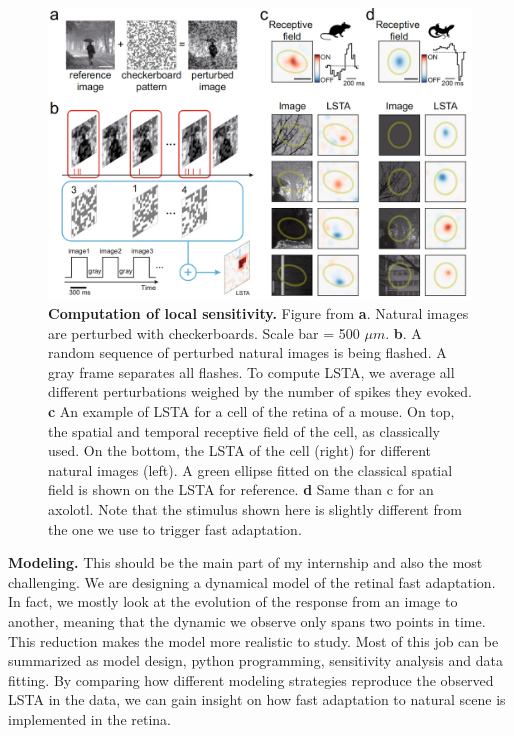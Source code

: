 \begin{figure}
    \centering
    \includegraphics[width=\textwidth]{images/LSTAExplain.png}
    \caption{\textbf{Computation of local sensitivity.} Figure from \citep{goldin_context-dependent_2022} \textbf{a}. Natural images are perturbed with checkerboards. Scale bar = 500 $\mu m$. \textbf{b}. A random sequence of perturbed natural images is being flashed. A gray frame separates all flashes. To compute LSTA, we average all different perturbations weighed by the number of spikes they evoked. \textbf{c} An example of LSTA for a cell of the retina of a mouse. On top, the spatial and temporal receptive field of the cell, as classically used. On the bottom, the LSTA of the cell (right) for different natural images (left).  A green ellipse fitted on the classical spatial field is shown on the LSTA for reference. \textbf{d} Same than c for an axolotl. Note that the stimulus shown here is slightly different from the one we use to trigger fast adaptation. }
    \label{fig:LSTA}
\end{figure}

\hfill \break

\textbf{Modeling.} This should be the main part of my internship and also the most challenging. We are designing a dynamical model of the retinal fast adaptation. In fact, we mostly look at the evolution of the response from an image to another, meaning that the dynamic we observe only spans two points in time. This reduction makes the model more realistic to study. Most of this job can be summarized as model design, python programming, sensitivity analysis and data fitting. By comparing how different modeling strategies reproduce the observed LSTA in the data, we can gain insight on how fast adaptation to natural scene is implemented in the retina.

